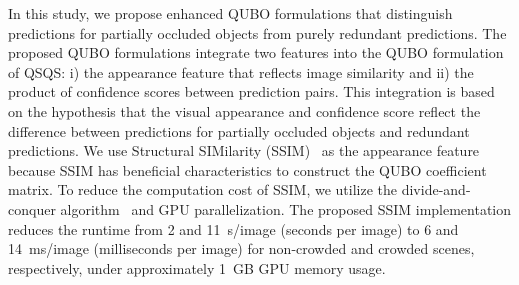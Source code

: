 In this study, we propose enhanced QUBO formulations that distinguish predictions for partially occluded objects from purely redundant predictions.
The proposed QUBO formulations integrate two features into the QUBO formulation of QSQS: i) the appearance feature that reflects image similarity and ii) the product of confidence scores between prediction pairs.
This integration is based on the hypothesis that the visual appearance and confidence score reflect the difference between predictions for partially occluded objects and redundant predictions.
We use Structural SIMilarity (SSIM)~\cite{wang2004ssim} as the appearance feature because SSIM has beneficial characteristics to construct the QUBO coefficient matrix.
To reduce the computation cost of SSIM, we utilize the divide-and-conquer algorithm~\cite{doi:10.1137/S0895479892241287,Dwyer1987} and GPU parallelization. The proposed SSIM implementation reduces the runtime from 2 and 11~s/image (seconds per image) to 6 and 14~ms/image (milliseconds per image) for non-crowded and crowded scenes, respectively, under approximately 1~GB GPU memory usage.

